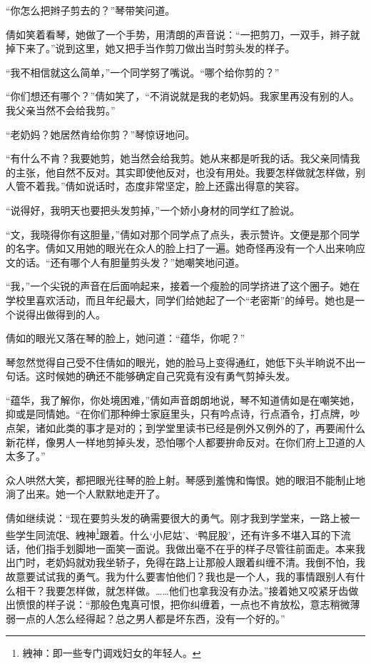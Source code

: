 \par “你怎么把辫子剪去的？”琴带笑问道。
\par 倩如笑着看琴，她做了一个手势，用清朗的声音说：“一把剪刀，一双手，辫子就掉下来了。”说到这里，她又把手当作剪刀做出当时剪头发的样子。
\par “我不相信就这么简单，”一个同学努了嘴说。“哪个给你剪的？”
\par “你们想还有哪个？”倩如笑了，“不消说就是我的老奶妈。我家里再没有别的人。我父亲当然不会给我剪。”
\par “老奶妈？她居然肯给你剪？”琴惊讶地问。
\par “有什么不肯？我要她剪，她当然会给我剪。她从来都是听我的话。我父亲同情我的主张，他自然不反对。其实即使他反对，也没有用处。我要怎样做就怎样做，别人管不着我。”倩如说话时，态度非常坚定，脸上还露出得意的笑容。
\par “说得好，我明天也要把头发剪掉，”一个娇小身材的同学红了脸说。
\par “文，我晓得你有这胆量，”倩如对那个同学点了点头，表示赞许。文便是那个同学的名字。倩如又用她的眼光在众人的脸上扫了一遍。她奇怪再没有一个人出来响应文的话。“还有哪个人有胆量剪头发？”她嘲笑地问道。
\par “我，”一个尖锐的声音在后面响起来，接着一个瘦脸的同学挤进了这个圈子。她在学校里喜欢活动，而且年纪最大，同学们给她起了一个“老密斯”的绰号。她也是一个说得出做得到的人。
\par 倩如的眼光又落在琴的脸上，她问道：“蕴华，你呢？”
\par 琴忽然觉得自己受不住倩如的眼光，她的脸马上变得通红，她低下头半晌说不出一句话。这时候她的确还不能够确定自己究竟有没有勇气剪掉头发。
\par “蕴华，我了解你，你处境困难，”倩如声音朗朗地说，琴不知道倩如是在嘲笑她，抑或是同情她。“在你们那种绅士家庭里头，只有吟点诗，行点酒令，打点牌，吵点架，诸如此类的事才是对的；到学堂里读书已经是例外又例外的了，再要闹什么新花样，像男人一样地剪掉头发，恐怕哪个人都要拚命反对。在你们府上卫道的人太多了。”
\par 众人哄然大笑，都把眼光往琴的脸上射。琴感到羞愧和悔恨。她的眼泪不能制止地淌了出来。她一个人默默地走开了。
\par 倩如继续说：“现在要剪头发的确需要很大的勇气。刚才我到学堂来，一路上被一些学生同流氓、絏神\footnote{絏神：即一些专门调戏妇女的年轻人。}跟着。什么‘小尼姑’、‘鸭屁股’，还有许多不堪入耳的下流话，他们指手划脚地一面笑一面说。我做出毫不在乎的样子尽管往前面走。本来我出门时，老奶妈就劝我坐轿子，免得在路上让那般人跟着纠缠不清。我倒不怕，我故意要试试我的勇气。我为什么要害怕他们？我也是一个人，我的事情跟别人有什么相干？我要怎样做，就怎样做。……他们也拿我没有办法。”接着她又咬紧牙齿做出愤恨的样子说：“那般色鬼真可恨，把你纠缠着，一点也不肯放松，意志稍微薄弱一点的人怎么经得起？总之男人都是坏东西，没有一个好的。”
